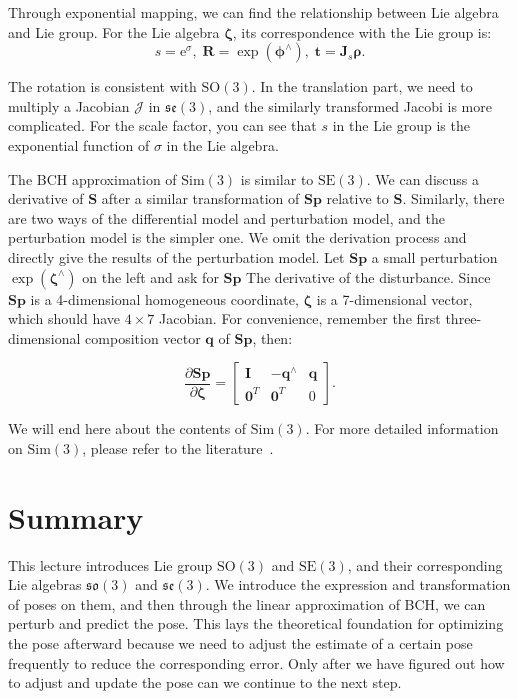 Through exponential mapping, we can find the relationship between Lie algebra and Lie group. For the Lie algebra $\boldsymbol{\zeta}$, its correspondence with the Lie group is:
\begin{equation}
s=\mathrm{e}^\sigma, \; \mathbf{R} = \exp( \boldsymbol{\phi} ^\wedge), \; \mathbf{t} = \mathbf{J}_s \boldsymbol{ \rho}.
\end{equation}

The rotation is consistent with $\mathrm{SO}(3)$. In the translation part, we need to multiply a Jacobian $\boldsymbol{\mathcal{J}}$ in $\mathfrak{se}(3)$, and the similarly transformed Jacobi is more complicated. For the scale factor, you can see that $s$ in the Lie group is the exponential function of $\sigma$ in the Lie algebra.

The BCH approximation of $\mathrm{Sim}(3)$ is similar to $\mathrm{SE}(3)$. We can discuss a derivative of $\mathbf{S}$ after a similar transformation of $\mathbf{S} \mathbf{p}$ relative to $\mathbf{S}$. Similarly, there are two ways of the differential model and perturbation model, and the perturbation model is the simpler one. We omit the derivation process and directly give the results of the perturbation model. Let $\mathbf{S} \mathbf{p}$ a small perturbation $\exp( \boldsymbol{\zeta} ^\wedge )$ on the left and ask for $\mathbf{S} \mathbf{p}$ The derivative of the disturbance. Since $\mathbf{S} \mathbf{p}$ is a 4-dimensional homogeneous coordinate, $\boldsymbol{\zeta}$ is a 7-dimensional vector, which should have $4 \times 7$ Jacobian. For convenience, remember the first three-dimensional composition vector $\mathbf{q}$ of $\mathbf{Sp}$, then:

\begin{equation}
\frac{{\partial \mathbf{Sp}}}{{\partial \boldsymbol{\zeta} }} = \left[ {\begin{array}{*{20}{c}}
    \mathbf{I} &{ - {\mathbf{q}^ \wedge }}& \mathbf{q} \\
    {{\mathbf{0}^T}} & {{ \mathbf{0}^T}}&0
    \end{array}} \right].
\end{equation}

We will end here about the contents of $\mathrm{Sim}(3)$. For more detailed information on $\mathrm{Sim}(3)$, please refer to the literature~\cite{Strasdat2012a}.

\section{Summary}
This lecture introduces Lie group $\mathrm{SO}(3)$ and $\mathrm{SE}(3)$, and their corresponding Lie algebras $\mathfrak{so}(3)$ and $\mathfrak{se }(3)$. We introduce the expression and transformation of poses on them, and then through the linear approximation of BCH, we can perturb and predict the pose. This lays the theoretical foundation for optimizing the pose afterward because we need to adjust the estimate of a certain pose frequently to reduce the corresponding error. Only after we have figured out how to adjust and update the pose can we continue to the next step.


